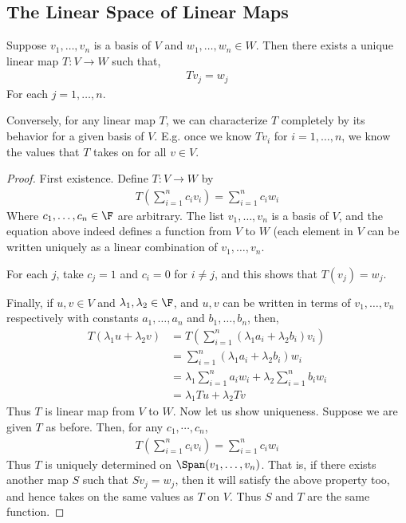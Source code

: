 \documentclass{article}
\begin{document}
\subsection{The Linear Space of Linear Maps}
  \begin{prop}\label{prop:lin_map_defined_on_basis}
    Suppose $v_1, \dots, v_n$ is a basis of $V$ and $w_1, \dots, w_n \in W$. Then there exists a unique linear map $T: V \to W$ such that,
    \begin{align*}
      Tv_j = w_j
    \end{align*}
    For each $j = 1, \dots, n$.
  \end{prop}
  \begin{remark}
    Conversely, for any linear map $T$, we can characterize $T$ completely by its behavior for a given basis of $V$. E.g. once we know $Tv_i$ for $i = 1, \dots, n$, we know the values that
    $T$ takes on for all $v \in V$.
  \end{remark}
  \begin{proof}
    First existence. Define $T: V \to W$ by
    \begin{align*}
      T(\sum_{i = 1}^{n}c_iv_i) = \sum_{i = 1}^{n}c_iw_i
    \end{align*}
    Where $c_1, \dots, c_n \in \F$ are arbitrary. The list $v_1, \dots, v_n$ is a basis of $V$, and the equation above indeed defines a function from $V$ to $W$ (each element in $V$ can be
    written uniquely as a linear combination of $v_1, \dots, v_n$.

    For each $j$, take $c_j = 1$ and $c_i = 0$ for $i \neq j$, and this shows that $T(v_j) = w_j$.

    Finally, if $u, v \in V$ and $\lambda_1, \lambda_2 \in \F$, and $u, v$ can be written in terms of $v_1, \dots, v_n$ respectively with constants $a_1, \dots, a_n$ and $b_1, \dots, b_n$,
    then,
    \begin{align*}
      T(\lambda_1u + \lambda_2v) & = T(\sum_{i = 1}^{n}(\lambda_1a_i + \lambda_2b_i)v_i) \\
      & = \sum_{i = 1}^{n}(\lambda_1a_i + \lambda_2b_i)w_i \\
      & = \lambda_1\sum_{i = 1}^{n}a_iw_i + \lambda_2\sum_{i = 1}^{n}b_iw_i \\
      & = \lambda_1Tu + \lambda_2Tv
    \end{align*}
    Thus $T$ is linear map from $V$ to $W$. Now let us show uniqueness. Suppose we are given $T$ as before. Then, for any $c_1, \cdots, c_n$,
    \begin{align*}
      T(\sum_{i = 1}^{n}c_iv_i) = \sum_{i = 1}^{n}c_iw_i
    \end{align*}
    Thus $T$ is uniquely determined on $\Span(v_1, \dots, v_n)$. That is, if there exists another map $S$ such that $Sv_j = w_j$, then it will satisfy the above property too, and hence takes
    on the same values as $T$ on $V$. Thus $S$ and $T$ are the same function.
  \end{proof}
\end{document}
